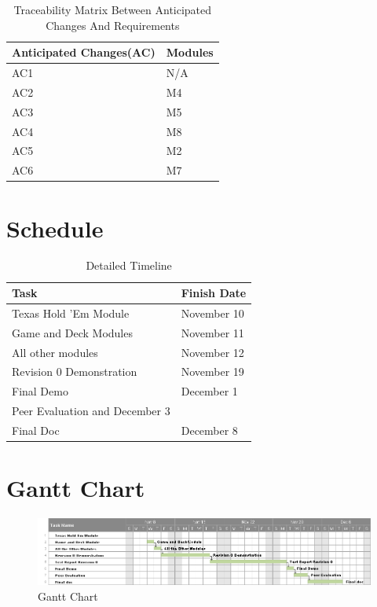 \documentclass[11pt]{article}
\begin{document}
    \begin{table}[h]
    \caption{Traceability Matrix Between Anticipated Changes And Requirements}
    \begin{tabular}{p{4cm}p{2cm}}
    Anticipated Changes(AC) & Modules\\
    \hline
    AC1 & N/A\\
    \hline
    AC2 & M4\\
    \hline
    AC3 & M5\\
    \hline
    AC4 & M8\\
    \hline
    AC5 & M2\\
    \hline
    AC6 & M7\\
    \hline
    \end{tabular}
    \end{table}
    \newpage
    \newpage
    \section{Schedule}
     \begin{table}[h]
    \caption{Detailed Timeline}
    \begin{tabular}{p{5cm}p{7cm}}
    Task & Finish Date\\
    \hline
    Texas Hold 'Em Module & November 10\\
    \hline
    Game and Deck Modules & November 11\\
    \hline
    All other modules & November 12\\
    \hline
    Revision 0 Demonstration & November 19\\
    \hline
    Final Demo & December 1\\
    \hline
    Peer Evaluation and December 3\\
    \hline
    Final Doc & December 8\\
    \hline
    \end{tabular}
    \end{table}
    
 
    \section{Gantt Chart}
		\begin{figure}[h]
		\includegraphics[scale=0.4]{Gantt.png}
		\caption{Gantt Chart}
		\label{fig1: Figure1}
		\end{figure}
        
    
\end{document}
